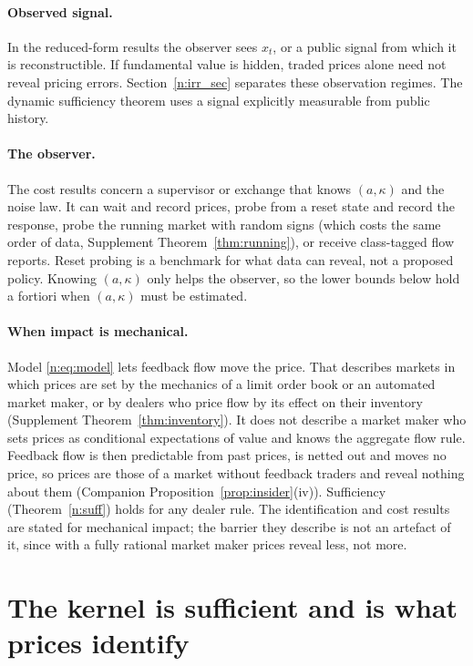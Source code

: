 \documentclass[12pt]{article}
\theoremstyle{definition}
\theoremstyle{remark}
\begin{document}
\paragraph{Observed signal.} In the reduced-form results the observer sees $x_t$, or a public signal from which it is reconstructible. If fundamental value is hidden, traded prices alone need not reveal pricing errors. Section~\ref{n:irr_sec} separates these observation regimes. The dynamic sufficiency theorem uses a signal explicitly measurable from public history.

\paragraph{The observer.} The cost results concern a supervisor or exchange that knows $(a,\kappa)$ and the noise law. It can wait and record prices, probe from a reset state and record the response, probe the running market with random signs (which costs the same order of data, Supplement Theorem~\ref{thm:running}), or receive class-tagged flow reports. Reset probing is a benchmark for what data can reveal, not a proposed policy. Knowing $(a,\kappa)$ only helps the observer, so the lower bounds below hold a fortiori when $(a,\kappa)$ must be estimated.

\paragraph{When impact is mechanical.} Model \eqref{n:eq:model} lets feedback flow move the price. That describes markets in which prices are set by the mechanics of a limit order book or an automated market maker, or by dealers who price flow by its effect on their inventory (Supplement Theorem~\ref{thm:inventory}). It does not describe a market maker who sets prices as conditional expectations of value and knows the aggregate flow rule. Feedback flow is then predictable from past prices, is netted out and moves no price, so prices are those of a market without feedback traders and reveal nothing about them (Companion Proposition~\ref{prop:insider}(iv)). Sufficiency (Theorem~\ref{n:suff}) holds for any dealer rule. The identification and cost results are stated for mechanical impact; the barrier they describe is not an artefact of it, since with a fully rational market maker prices reveal less, not more.

\section{The kernel is sufficient and is what prices identify}\label{n:suff_sec}
\end{document}
